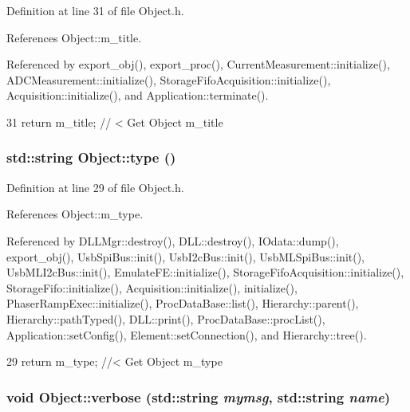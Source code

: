 Definition at line 31 of file Object.h.

References Object::m\_\-title.

Referenced by export\_\-obj(), export\_\-proc(), CurrentMeasurement::initialize(), ADCMeasurement::initialize(), StorageFifoAcquisition::initialize(), Acquisition::initialize(), and Application::terminate().


\begin{DoxyCode}
31 { return m_title;      } // < Get Object m_title
\end{DoxyCode}
\hypertarget{classObject_a84f99f70f144a83e1582d1d0f84e4e62}{
\subsubsection[{type}]{\setlength{\rightskip}{0pt plus 5cm}std::string Object::type ()}}
\label{classObject_a84f99f70f144a83e1582d1d0f84e4e62}


Definition at line 29 of file Object.h.

References Object::m\_\-type.

Referenced by DLLMgr::destroy(), DLL::destroy(), IOdata::dump(), export\_\-obj(), UsbSpiBus::init(), UsbI2cBus::init(), UsbMLSpiBus::init(), UsbMLI2cBus::init(), EmulateFE::initialize(), StorageFifoAcquisition::initialize(), StorageFifo::initialize(), Acquisition::initialize(), initialize(), PhaserRampExec::initialize(), ProcDataBase::list(), Hierarchy::parent(), Hierarchy::pathTyped(), DLL::print(), ProcDataBase::procList(), Application::setConfig(), Element::setConnection(), and Hierarchy::tree().


\begin{DoxyCode}
29 { return m_type;       } //< Get Object m_type
\end{DoxyCode}
\hypertarget{classObject_a2d4120195317e2a3c6532e8bb9f3da68}{
\subsubsection[{verbose}]{\setlength{\rightskip}{0pt plus 5cm}void Object::verbose (std::string {\em mymsg}, \/  std::string {\em name})}}
\label{classObject_a2d4120195317e2a3c6532e8bb9f3da68}


